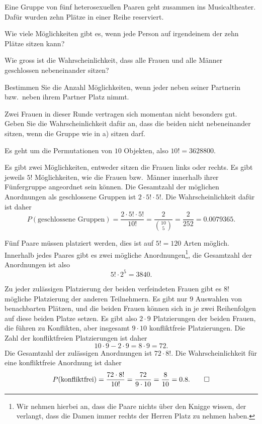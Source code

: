 Eine Gruppe von fünf heterosexuellen Paaren geht zusammen ins Musicaltheater.
Dafür wurden zehn Plätze in einer Reihe reserviert.
\begin{teilaufgaben}
\item
Wie viele Möglichkeiten gibt es, wenn jede Person auf irgendeinem
der zehn Plätze sitzen kann?
\item 
Wie gross ist die Wahrscheinlichkeit, dass alle Frauen und alle Männer
geschlossen nebeneinander sitzen?
\item
Bestimmen Sie die Anzahl Möglichkeiten, wenn jeder neben seiner Partnerin
bzw.~neben ihrem Partner Platz nimmt.
\item
Zwei Frauen in dieser Runde vertragen sich momentan nicht besonders gut.
Geben Sie die Wahrscheinlichkeit dafür an, dass die beiden nicht 
nebeneinander sitzen, wenn die Gruppe wie in a) sitzen
darf.
\end{teilaufgaben}

\begin{loesung}
\begin{teilaufgaben}
\item
Es geht um die Permutationen von $10$ Objekten, also $10!=3628800$.
\item
Es gibt zwei Möglichkeiten, entweder sitzen die Frauen links oder rechts.
Es gibt jeweils $5!$ Möglichkeiten, wie die Frauen bzw.~Männer innerhalb
ihrer Fünfergruppe angeordnet sein können. Die Gesamtzahl der möglichen
Anordnungen als geschlossene Gruppen ist $2\cdot 5!\cdot 5!$.
Die Wahrscheinlichkeit dafür ist daher
\[
P(\text{geschlossene Gruppen})
=
\frac{2\cdot 5!\cdot 5!}{10!}
=
\frac{2}{\binom{10}{5}}
=\frac2{252}=0.0079365.
\]
\item
Fünf Paare müssen platziert werden, dies ist auf $5!=120$ Arten
möglich.
Innerhalb jedes Paares gibt es zwei mögliche Anordnungen\footnote{Wir nehmen
hierbei an, dass die Paare nichts über den Knigge wissen, der verlangt,
dass die Damen immer rechts der Herren Platz zu nehmen haben.}, die
Gesamtzahl der Anordnungen ist also
\[
5!\cdot 2^5=3840.
\]
\item
Zu jeder zulässigen Platzierung der beiden verfeindeten Frauen gibt es
$8!$ mögliche Platzierung der anderen Teilnehmern.
Es gibt nur $9$ Auswahlen von benachbarten Plätzen, und die beiden
Frauen können sich in je zwei Reihenfolgen auf diese beiden Platze
setzen.
Es gibt also $2\cdot 9$ Platzierungen
der beiden Frauen, die führen zu Konflikten,
aber insgesamt $9\cdot 10$ konfliktfreie Platzierungen.
Die Zahl der konfliktfreien Platzierungen ist daher
\[
10\cdot 9-2\cdot 9= 8\cdot 9 = 72.
\]
Die Gesamtzahl der zulässigen Anordnungen ist $72\cdot 8!$.
Die Wahrscheinlichkeit für eine konfliktfreie Anordnung ist daher
\[
P(\text{konfliktfrei}) = \frac{72\cdot 8!}{10!}=\frac{72}{9\cdot 10}
=\frac{8}{10}=0.8.
\qedhere
\]
\end{teilaufgaben}
\end{loesung}

